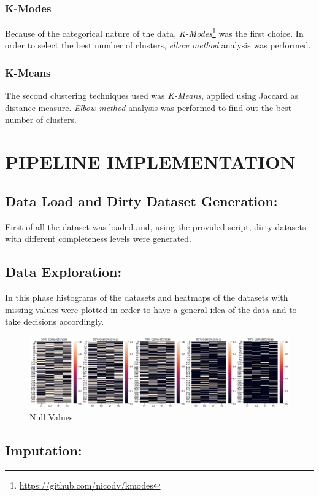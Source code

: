 \documentclass{article}
\begin{document}
\subsubsection{K-Modes}
Because of the categorical nature of the data, \emph{K-Modes}\footnote{\url{https://github.com/nicodv/kmodes}} was the first choice. In order to select the best number of clusters, \emph{elbow method} analysis was performed.

\subsubsection{K-Means}
The second clustering techniques used was \emph{K-Means}, applied using Jaccard as distance measure. \emph{Elbow method} analysis was performed to find out the best number of clusters.

\newpage
\section{PIPELINE IMPLEMENTATION}

	\subsection{Data Load and Dirty Dataset Generation:} First of all the dataset was loaded and, using the provided script, dirty datasets with different completeness levels were generated.
	\subsection{Data Exploration:} In this phase histograms of the datasets and heatmaps of the datasets with missing values were plotted in order to have a general idea of the data and to take decisions accordingly.
\begin{figure}[h]
	\includegraphics[width=\textwidth]{img/heatmaps.png}
	\caption{Null Values}
\end{figure}

\subsection{Imputation:} %
\end{document}
